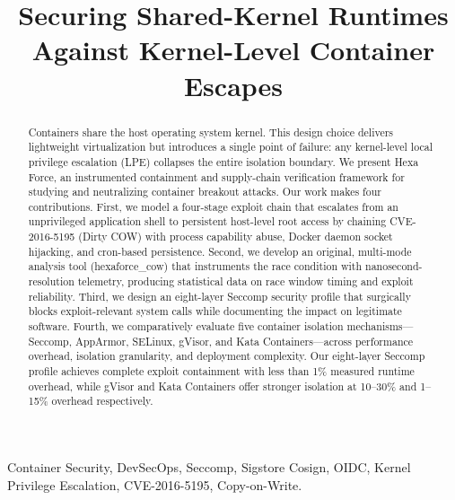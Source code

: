 \documentclass[conference]{IEEEtran}
\begin{document}
\title{Securing Shared-Kernel Runtimes Against Kernel-Level Container Escapes}

\author{
}

\maketitle

\begin{abstract}
Containers share the host operating system kernel. This design choice delivers lightweight virtualization but introduces a single point of failure: any kernel-level local privilege escalation (LPE) collapses the entire isolation boundary. We present Hexa Force, an instrumented containment and supply-chain verification framework for studying and neutralizing container breakout attacks. Our work makes four contributions. First, we model a four-stage exploit chain that escalates from an unprivileged application shell to persistent host-level root access by chaining CVE-2016-5195 (Dirty COW) with process capability abuse, Docker daemon socket hijacking, and cron-based persistence. Second, we develop an original, multi-mode analysis tool (hexaforce\_cow) that instruments the race condition with nanosecond-resolution telemetry, producing statistical data on race window timing and exploit reliability. Third, we design an eight-layer Seccomp security profile that surgically blocks exploit-relevant system calls while documenting the impact on legitimate software. Fourth, we comparatively evaluate five container isolation mechanisms---Seccomp, AppArmor, SELinux, gVisor, and Kata Containers---across performance overhead, isolation granularity, and deployment complexity. Our eight-layer Seccomp profile achieves complete exploit containment with less than 1\% measured runtime overhead, while gVisor and Kata Containers offer stronger isolation at 10--30\% and 1--15\% overhead respectively.
\end{abstract}

\begin{IEEEkeywords}
Container Security, DevSecOps, Seccomp, Sigstore Cosign, OIDC, Kernel Privilege Escalation, CVE-2016-5195, Copy-on-Write.
\end{IEEEkeywords}
\end{document}
